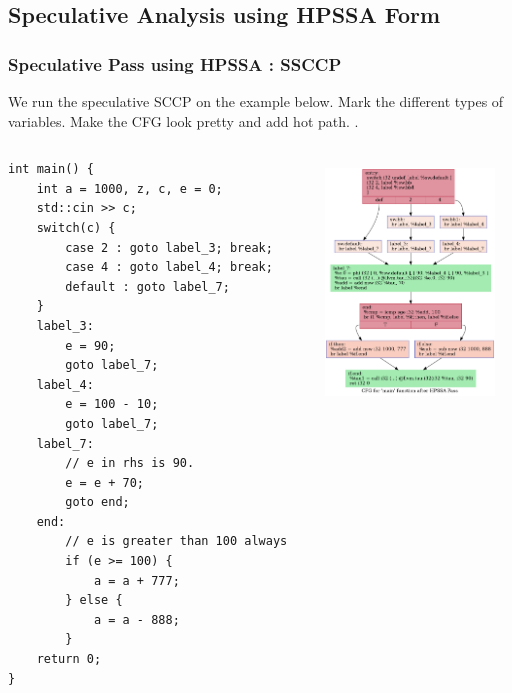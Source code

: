 \documentclass[aspectratio=169]{beamer}
\begin{document}
\subsection{Speculative Analysis using HPSSA Form}
\begin{frame}[fragile]
	\frametitle{Speculative Pass using HPSSA : SSCCP}
	We run the speculative SCCP on the example below. \color{red} Mark the different types of variables. Make the CFG look pretty and add hot path. \color{black}.
	\begin{columns}
		\begin{column}{0.2\textwidth}
			\begin{verbatim}
int main() {
	int a = 1000, z, c, e = 0;
	std::cin >> c;
	switch(c) {   
		case 2 : goto label_3; break;
		case 4 : goto label_4; break;
		default : goto label_7; 
	}
	label_3:
		e = 90;
		goto label_7;
	label_4:
		e = 100 - 10;
		goto label_7;
	label_7:
		// e in rhs is 90.
		e = e + 70;  
		goto end;
	end:
		// e is greater than 100 always
		if (e >= 100) {  
			a = a + 777;
		} else {
			a = a - 888;
		} 
	return 0; 
}
			\end{verbatim}
		\end{column}
		\begin{column}{0.5\textwidth}  
			\begin{center}
				\includegraphics[width=4.5cm,height=6.5cm]{afterHPSSA.dot.png}
			\end{center}
		\end{column}
	\end{columns}
\end{frame}
\end{document}
